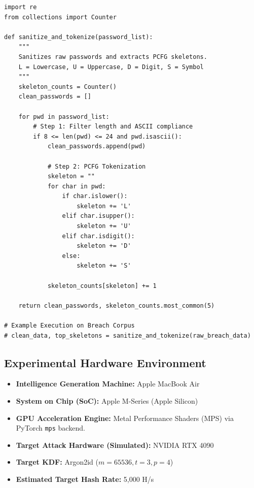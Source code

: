 \documentclass[conference]{IEEEtran}
\begin{document}
\begin{lstlisting}
import re
from collections import Counter

def sanitize_and_tokenize(password_list):
    """
    Sanitizes raw passwords and extracts PCFG skeletons.
    L = Lowercase, U = Uppercase, D = Digit, S = Symbol
    """
    skeleton_counts = Counter()
    clean_passwords = []
    
    for pwd in password_list:
        # Step 1: Filter length and ASCII compliance
        if 8 <= len(pwd) <= 24 and pwd.isascii():
            clean_passwords.append(pwd)
            
            # Step 2: PCFG Tokenization
            skeleton = ""
            for char in pwd:
                if char.islower():
                    skeleton += 'L'
                elif char.isupper():
                    skeleton += 'U'
                elif char.isdigit():
                    skeleton += 'D'
                else:
                    skeleton += 'S'
            
            skeleton_counts[skeleton] += 1
            
    return clean_passwords, skeleton_counts.most_common(5)

# Example Execution on Breach Corpus
# clean_data, top_skeletons = sanitize_and_tokenize(raw_breach_data)
\end{lstlisting}

\subsection{Experimental Hardware Environment}
\begin{itemize}
    \item \textbf{Intelligence Generation Machine:} Apple MacBook Air
    \item \textbf{System on Chip (SoC):} Apple M-Series (Apple Silicon)
    \item \textbf{GPU Acceleration Engine:} Metal Performance Shaders (MPS) via PyTorch \texttt{mps} backend.
    \item \textbf{Target Attack Hardware (Simulated):} NVIDIA RTX 4090 
    \item \textbf{Target KDF:} Argon2id ($m=65536, t=3, p=4$)
    \item \textbf{Estimated Target Hash Rate:} 5,000 H/s
\end{itemize}
\end{document}
